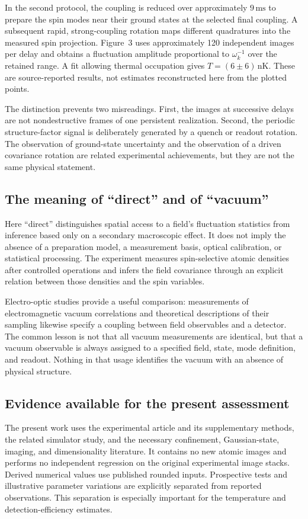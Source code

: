 \documentclass[11pt,a4paper]{article}
\theoremstyle{definition}
\theoremstyle{remark}
\begin{document}
In the second protocol, the coupling is reduced over approximately $9\,\mathrm{ms}$ to prepare the spin modes near their ground states at the selected final coupling. A subsequent rapid, strong-coupling rotation maps different quadratures into the measured spin projection. Figure~3 uses approximately 120 independent images per delay and obtains a fluctuation amplitude proportional to $\omega_k^{-1}$ over the retained range. A fit allowing thermal occupation gives $T=(6\pm6)\,\mathrm{nK}$. These are source-reported results, not estimates reconstructed here from the plotted points.\cite{zhang2026}

The distinction prevents two misreadings. First, the images at successive delays are not nondestructive frames of one persistent realization. Second, the periodic structure-factor signal is deliberately generated by a quench or readout rotation. The observation of ground-state uncertainty and the observation of a driven covariance rotation are related experimental achievements, but they are not the same physical statement.\cite{zhang2026}

\subsection{The meaning of ``direct'' and of ``vacuum''}
Here ``direct'' distinguishes spatial access to a field's fluctuation statistics from inference based only on a secondary macroscopic effect. It does not imply the absence of a preparation model, a measurement basis, optical calibration, or statistical processing. The experiment measures spin-selective atomic densities after controlled operations and infers the field covariance through an explicit relation between those densities and the spin variables.\cite{zhang2026,hung}

Electro-optic studies provide a useful comparison: measurements of electromagnetic vacuum correlations and theoretical descriptions of their sampling likewise specify a coupling between field observables and a detector. The common lesson is not that all vacuum measurements are identical, but that a vacuum observable is always assigned to a specified field, state, mode definition, and readout. Nothing in that usage identifies the vacuum with an absence of physical structure.\cite{benea,moskalenko}

\subsection{Evidence available for the present assessment}
The present work uses the experimental article and its supplementary methods, the related simulator study, and the necessary confinement, Gaussian-state, imaging, and dimensionality literature. It contains no new atomic images and performs no independent regression on the original experimental image stacks. Derived numerical values use published rounded inputs. Prospective tests and illustrative parameter variations are explicitly separated from reported observations. This separation is especially important for the temperature and detection-efficiency estimates.\cite{zhang2026}
\end{document}
